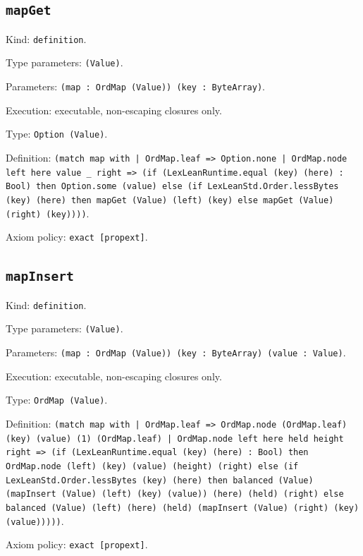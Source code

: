 \documentclass[11pt]{article}
\begin{document}
\subsection*{\texttt{mapGet}}
\noindent Kind: \texttt{definition}.\par
\noindent Type parameters: \texttt{(Value)}.\par
\noindent Parameters: \texttt{(map : OrdMap (Value)) (key : ByteArray)}.\par
\noindent Execution: executable, non-escaping closures only.\par
\noindent Type: \texttt{Option (Value)}.\par
\noindent Definition: \texttt{(match map with | OrdMap.leaf => Option.none | OrdMap.node left here value \_ right => (if (LexLeanRuntime.equal (key) (here) : Bool) then Option.some (value) else (if LexLeanStd.Order.lessBytes (key) (here) then mapGet (Value) (left) (key) else mapGet (Value) (right) (key))))}.\par
\noindent Axiom policy: \texttt{exact [propext]}.\par
\subsection*{\texttt{mapInsert}}
\noindent Kind: \texttt{definition}.\par
\noindent Type parameters: \texttt{(Value)}.\par
\noindent Parameters: \texttt{(map : OrdMap (Value)) (key : ByteArray) (value : Value)}.\par
\noindent Execution: executable, non-escaping closures only.\par
\noindent Type: \texttt{OrdMap (Value)}.\par
\noindent Definition: \texttt{(match map with | OrdMap.leaf => OrdMap.node (OrdMap.leaf) (key) (value) (1) (OrdMap.leaf) | OrdMap.node left here held height right => (if (LexLeanRuntime.equal (key) (here) : Bool) then OrdMap.node (left) (key) (value) (height) (right) else (if LexLeanStd.Order.lessBytes (key) (here) then balanced (Value) (mapInsert (Value) (left) (key) (value)) (here) (held) (right) else balanced (Value) (left) (here) (held) (mapInsert (Value) (right) (key) (value)))))}.\par
\noindent Axiom policy: \texttt{exact [propext]}.\par
\end{document}
